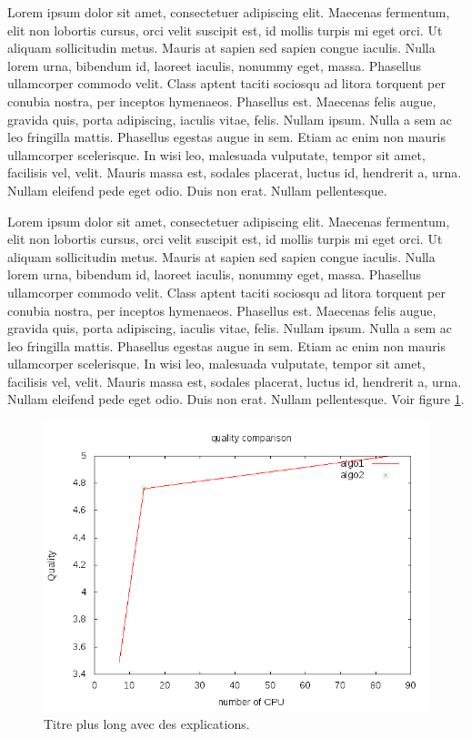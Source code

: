 Lorem ipsum dolor sit amet, consectetuer adipiscing elit. Maecenas fermentum, elit non lobortis cursus, orci velit suscipit est, id mollis turpis mi eget orci. Ut aliquam sollicitudin metus. Mauris at sapien sed sapien congue iaculis. Nulla lorem urna, bibendum id, laoreet iaculis, nonummy eget, massa. Phasellus ullamcorper commodo velit. Class aptent taciti sociosqu ad litora torquent per conubia nostra, per inceptos hymenaeos. Phasellus est. Maecenas felis augue, gravida quis, porta adipiscing, iaculis vitae, felis. Nullam ipsum. Nulla a sem ac leo fringilla mattis. Phasellus egestas augue in sem. Etiam ac enim non mauris ullamcorper scelerisque. In wisi leo, malesuada vulputate, tempor sit amet, facilisis vel, velit. Mauris massa est, sodales placerat, luctus id, hendrerit a, urna. Nullam eleifend pede eget odio. Duis non erat. Nullam pellentesque.

Lorem ipsum dolor sit amet, consectetuer adipiscing elit. Maecenas fermentum, elit non lobortis cursus, orci velit suscipit est, id mollis turpis mi eget orci. Ut aliquam sollicitudin metus. Mauris at sapien sed sapien congue iaculis. Nulla lorem urna, bibendum id, laoreet iaculis, nonummy eget, massa. Phasellus ullamcorper commodo velit. Class aptent taciti sociosqu ad litora torquent per conubia nostra, per inceptos hymenaeos. Phasellus est. Maecenas felis augue, gravida quis, porta adipiscing, iaculis vitae, felis. Nullam ipsum. Nulla a sem ac leo fringilla mattis. Phasellus egestas augue in sem. Etiam ac enim non mauris ullamcorper scelerisque. In wisi leo, malesuada vulputate, tempor sit amet, facilisis vel, velit. Mauris massa est, sodales placerat, luctus id, hendrerit a, urna. Nullam eleifend pede eget odio. Duis non erat. Nullam pellentesque.
Voir figure \ref{fig:mafigure2}.

\begin{figure}[ht]
   \begin{center}
      \includegraphics[width=0.6\linewidth]{chapter2/figures/comparison.png}
   \end{center}
   \caption[titre court pour la liste des figures]
   {\footnotesize Titre plus long avec des explications.}
   \label{fig:mafigure2}
\end{figure}


